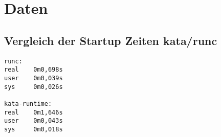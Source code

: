 \chapter{Daten}

\section{Vergleich der Startup Zeiten kata/runc}
\label{app:startuptimecomparison}
\begin{lstlisting}[caption={startuptime\_comparison}]
runc:
real	0m0,698s
user	0m0,039s
sys	    0m0,026s

kata-runtime:
real	0m1,646s
user	0m0,043s
sys	    0m0,018s    
\end{lstlisting}